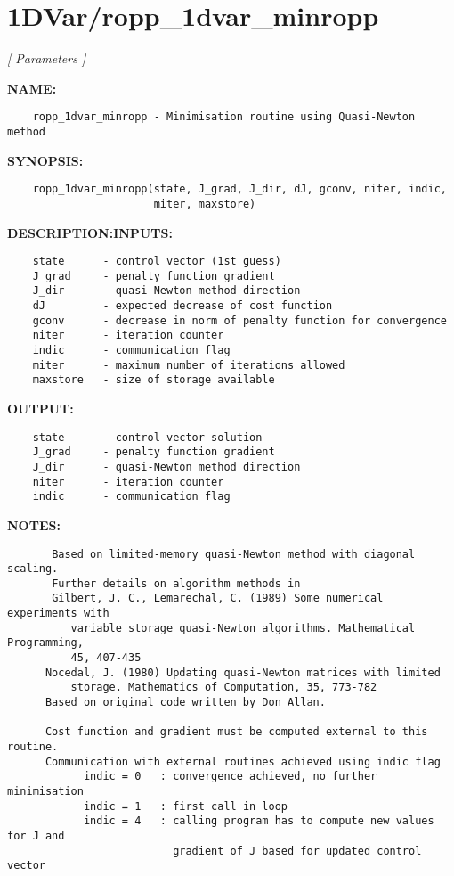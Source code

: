 \section{1DVar/ropp\_1dvar\_minropp}
\textsl{[ Parameters ]}

\label{ch:robo3}
\label{ch:1DVar_ropp_1dvar_minropp}
\textbf{NAME:}\hspace{0.08in}\begin{Verbatim}
    ropp_1dvar_minropp - Minimisation routine using Quasi-Newton method
\end{Verbatim}
\textbf{SYNOPSIS:}\hspace{0.08in}\begin{Verbatim}
    ropp_1dvar_minropp(state, J_grad, J_dir, dJ, gconv, niter, indic, 
                       miter, maxstore)
\end{Verbatim}
\textbf{DESCRIPTION:}\hspace{0.08in}\textbf{INPUTS:}\hspace{0.08in}\begin{Verbatim}
    state      - control vector (1st guess)
    J_grad     - penalty function gradient
    J_dir      - quasi-Newton method direction
    dJ         - expected decrease of cost function
    gconv      - decrease in norm of penalty function for convergence
    niter      - iteration counter
    indic      - communication flag
    miter      - maximum number of iterations allowed
    maxstore   - size of storage available
\end{Verbatim}
\textbf{OUTPUT:}\hspace{0.08in}\begin{Verbatim}
    state      - control vector solution
    J_grad     - penalty function gradient
    J_dir      - quasi-Newton method direction
    niter      - iteration counter
    indic      - communication flag
\end{Verbatim}
\textbf{NOTES:}\hspace{0.08in}\begin{Verbatim}
       Based on limited-memory quasi-Newton method with diagonal scaling.
       Further details on algorithm methods in  
       Gilbert, J. C., Lemarechal, C. (1989) Some numerical experiments with 
          variable storage quasi-Newton algorithms. Mathematical Programming, 
          45, 407-435  
      Nocedal, J. (1980) Updating quasi-Newton matrices with limited
          storage. Mathematics of Computation, 35, 773-782
      Based on original code written by Don Allan.

      Cost function and gradient must be computed external to this routine.
      Communication with external routines achieved using indic flag
            indic = 0   : convergence achieved, no further minimisation
            indic = 1   : first call in loop
            indic = 4   : calling program has to compute new values for J and 
                          gradient of J based for updated control vector
\end{Verbatim}
